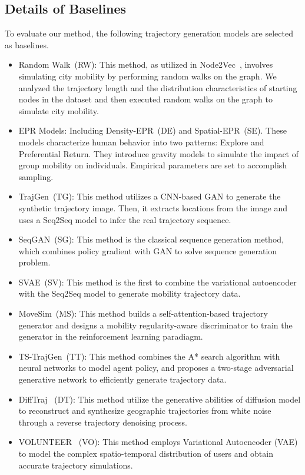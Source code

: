 \subsection{Details of Baselines}
To evaluate our method, the following trajectory generation models are selected as baselines.
\begin{itemize}
    \item Random Walk~\cite{node2vec}(RW): This method, as utilized in Node2Vec~\cite{node2vec}, involves simulating city mobility by performing random walks on the graph. We analyzed the trajectory length and the distribution characteristics of starting nodes in the dataset and then executed random walks on the graph to simulate city mobility.

    \item EPR Models: Including Density-EPR~\cite{epr_1}(DE) and Spatial-EPR~\cite{epr_2}(SE). These models characterize human behavior into two patterns: Explore and Preferential Return. They introduce gravity models to simulate the impact of group mobility on individuals. Empirical parameters are set to accomplish sampling.
    
    \item TrajGen~\cite{trajgen}(TG): This method utilizes a CNN-based GAN to generate the synthetic trajectory image. Then, it extracts locations from the image and uses a Seq2Seq model to infer the real trajectory sequence. 

    \item SeqGAN~\cite{SeqGAN}(SG): This method is the classical sequence generation method, which combines policy gradient with GAN to solve sequence generation problem.

    \item SVAE~\cite{SVAE}(SV): This method is the first to combine the variational autoencoder with the Seq2Seq model to generate mobility trajectory data.
    
    \item MoveSim~\cite{MoveSim}(MS): This method builds a self-attention-based trajectory generator and designs a mobility regularity-aware discriminator to train the generator in the reinforcement learning paradiagm.
    
    \item TS-TrajGen~\cite{ts_trajgen}(TT): This method combines the A* search algorithm with neural networks to model agent policy, and proposes a two-stage adversarial generative network to efficiently generate trajectory data.
    
    \item DiffTraj ~\cite{difftraj}(DT): This method utilize the generative abilities of diffusion model to reconstruct and synthesize geographic trajectories from white noise through a reverse trajectory denoising process.
    
    \item VOLUNTEER ~\cite{volunteer}(VO): This method employs Variational Autoencoder (VAE) to model the complex spatio-temporal distribution of users and obtain accurate trajectory simulations.
\end{itemize}
